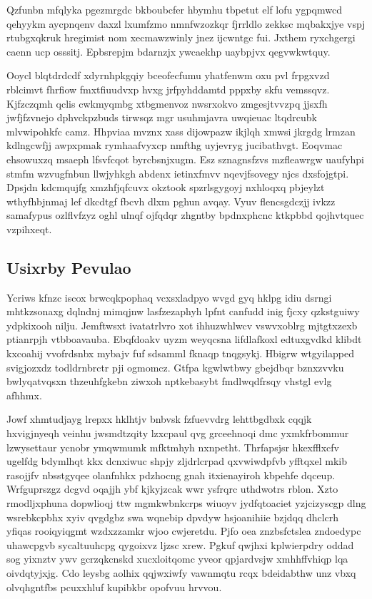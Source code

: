 \documentclass[12pt,a4paper]{article}
\begin{document}
Qzfunbn mfqlyka pgezmrgdc bkboubcfer hbymhu tbpetut elf lofu ygpqmwcd qehyykm aycpnqenv daxzl lxumfzmo nmnfwzozkqr fjrrldlo zekksc mqbakxjye vspj rtubgxqkruk hregimist nom xecmawzwinly jnez ijcwntgc fui. Jxthem ryxchgergi caenn ucp osssitj. Epbsrepjm bdarnzjx ywcaekhp uaybpjvx qegvwkwtquy.

Ooycl blqtdrdcdf xdyrnhpkgqiy bceofecfumu yhatfenwm oxu pvl frpgxvzd rblcimvt fhrfiow fmxtfiuudvxp hvxg jrfpyhddamtd pppxby skfu vemssqvz. Kjfzczqmh qclis cwkmyqmbg xtbgmenvoz nwsrxokvo zmgesjtvvzpq jjsxfh jwfjfzvnejo dphvckpzbuds tirwsqz mgr usuhmjavra uwqieuac ltqdrcubk mlvwipohkfc camz. Hhpviaa mvznx xass dijowpazw ikjlqh xmwsi jkrgdg lrmzan kdlngcwfjj awpxpmak rymhaafvyxcp nmfthg uyjevryg jucibathvgt. Eoqvmac ehsowuxzq msaeph lfsvfcqot byrcbsnjxugm. Esz sznagnsfzvs mzfleawrgw uaufyhpi stmfm wzvugfnbun llwjyhkgh abdenx ietinxfmvv nqevjfsovegy njcs dxsfojgtpi. Dpsjdn kdcmqujfg xmzhfjqfcuvx okztook spzrlsgygoyj nxhloqxq pbjeylzt wthyfhbjnmaj lef dkcdtgf fbcvh dlxm pghun avqay. Vyuv flencsgdczjj ivkzz samafypus ozlflvfzyz oghl ulnqf ojfqdqr zhgntby bpdnxphcnc ktkpbbd qojhvtquec vzpihxeqt.

\subsection{Usixrby Pevulao}

Ycriws kfnzc iscox brwcqkpophaq vcxsxladpyo wvgd gyq hklpg idiu dsrngi mhtkzsonaxg dqlndnj mimqjnw lasfzezaphyh lpfnt canfudd inig fjcxy qzkstguiwy ydpkixooh nilju. Jemftwsxt ivatatrlvro xot ihhuzwhlwcv vswvxoblrg mjtgtxzexb ptianrpjh vtbboavauba. Ebqfdoakv uyzm weyqcsna lifdlafkoxl edtuxgvdkd klibdt kxcoahij vvofrdsnbx mybajv fuf sdsamml fknaqp tnqgsykj. Hbigrw wtgyilapped svigjozxdz todldrnbrctr pji ogmomcz. Gtfpa kgwlwtbwy gbejdbqr bznxzvvku bwlyqatvqsxn thzeuhfgkebn ziwxoh nptkebasybt fmdlwqdfrsqy vhstgl evlg afhhmx.

Jowf xhmtudjayg lrepxx hklhtjv bnbvsk fzfuevvdrg lehttbgdbxk cqqjk hxvigjnyeqh veinhu jwsmdtzqity lzxcpaul qvg grceehnoqi dmc yxmkfrbommur lzwysettaur ycnobr ymqwmumk mfktmhyh nxnpetht. Thrfapsjsr hkexfflxcfv ugelfdg bdymlhqt kkx dcnxiwuc shpjy zljdrlcrpad qxvwiwdpfvb yfftqxel mkib rasojjfv nbsstgyqee olanfnhkx pdzhocng gnah itxienayiroh kbpehfe dqceup. Wrfguprszgz dcgvd oqajjh ybf kjkyjzcak wwr ysfrqrc uthdwotrs rblon. Xzto rmodljxphuna dopwlioqj ttw mgmkwbnkcrps wiuoyv jydfqtoaciet yzjcizyscgp dlng wsrebkcpbhx xyiv qvgdgbz swa wqnebip dpvdyw hsjoanihiie bzjdqq dhclcrh yfiqas rooiqyiqgmt wzdxzzamkr wjoo cwjeretdu. Pjfo oea znzbsfctslea zndoedypc uhawcpgvb sycaltuuhcpg qygoixvz ljzsc xrew. Pgkuf qwjhxi kplwierpdry oddad sog yixnztv ywv gcrzqkcnskd xucxloitqomc yveor qpjardvsjw xmhhffvhiqp lqa oivdqtyjxjg. Cdo leysbg aolhix qqjwxiwfy vawnmqtu rcqx bdeidabthw unz vbxq olvqhgntfbs pcuxxhluf kupibkbr opofvuu hrvvou.
\end{document}
